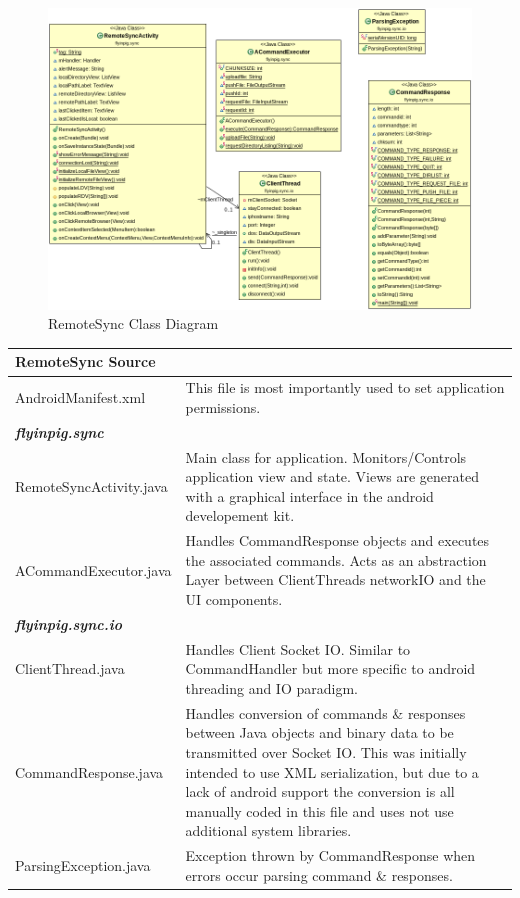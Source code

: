 \documentclass[12pt]{article}
\begin{document}
\begin{figure}[H]
\center
\includegraphics[width=1\textwidth]{android-class-diag.png}
\caption{RemoteSync Class Diagram}
\end{figure}

\begin{center}
\begin{tabular}{|l|p{7.5cm}|}
\hline
	\textbf{RemoteSync Source} \\
\hline 
	AndroidManifest.xml
	& This file is most importantly used to set application permissions.\\
\hline
	\emph{\textbf{flyinpig.sync}}\\
\hline
	RemoteSyncActivity.java
	& Main class for application. Monitors/Controls application view and state. Views are generated with a graphical interface in the android developement kit.\\
\hline
	ACommandExecutor.java
	& Handles CommandResponse objects and executes the associated commands. Acts as an abstraction Layer between ClientThreads networkIO and the UI components.\\
\hline
	\emph{\textbf{flyinpig.sync.io}}\\
\hline
	ClientThread.java
	& Handles Client Socket IO. Similar to CommandHandler but more specific to android threading and IO paradigm.\\
\hline
	CommandResponse.java
	& Handles conversion of commands \& responses between Java objects and binary data to be transmitted over Socket IO. This was initially intended to use XML serialization, but due to a lack of android support the conversion is all manually coded in this file and uses not use additional system libraries.\\
\hline
	ParsingException.java
	& Exception thrown by CommandResponse when errors occur parsing command \& responses.\\
\hline
\end{tabular}
\end{center}
\end{document}
